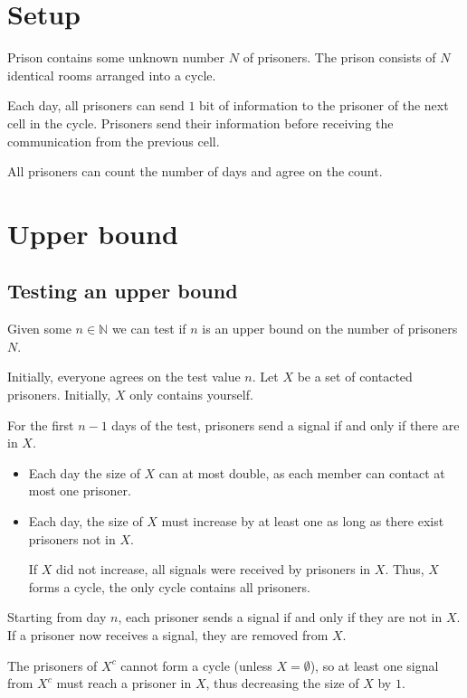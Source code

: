 \documentclass[a4paper, 11pt]{article}
\newcommand{\thetop}[5]{
	\begin{addmargin}[\oddsidemargin]{\oddsidemargin}
		\colorbox{#5}{\color{white}
			\hbox to \paperwidth{
				\vbox {
					\begin{center}
						{\large\montserratl #1}\\
						\vspace{4pt}
						{\huge\montserratb #2}\\
						{\montserratb #3}\\
						\vspace{-0.5em}
						\rule{20em}{1pt}

						{\large\montserratl
							#4
						}
					\end{center}
				}
			}
		}
	\end{addmargin}
}
\newcommand{\NN}{\mathbb{N}}
\begin{document}


\section*{Setup}
Prison contains some unknown number $N$ of prisoners. The prison consists of $N$ identical rooms arranged into a cycle.

Each day, all prisoners can send $1$ bit of information to the prisoner of the next cell in the cycle. Prisoners send their information before receiving the communication from the previous cell.

All prisoners can count the number of days and agree on the count. 


\section*{Upper bound}
\subsection*{Testing an upper bound}
Given some $n\in\NN$ we can test if $n$ is an upper bound on the number of prisoners $N$.

Initially, everyone agrees on the test value $n$. Let $X$ be a set of contacted prisoners. Initially, $X$ only contains yourself. 

For the first $n-1$ days of the test, prisoners send a signal if and only if there are in $X$.

\begin{itemize}
	\item Each day the size of $X$ can at most double, as each member can contact at most one prisoner. 

	\item Each day, the size of $X$ must increase by at least one as long as there exist prisoners not in $X$. 
	
	If $X$ did not increase, all signals were received by prisoners in $X$. Thus, $X$ forms a cycle, the only cycle contains all prisoners.
\end{itemize}

Starting from day $n$, each prisoner sends a signal if and only if they are not in $X$. If a prisoner now receives a signal, they are removed from $X$. 

The prisoners of $X^c$ cannot form a cycle (unless $X=\emptyset$), so at least one signal from $X^c$ must reach a prisoner in $X$, thus decreasing the size of $X$ by $1$. 
\end{document}
